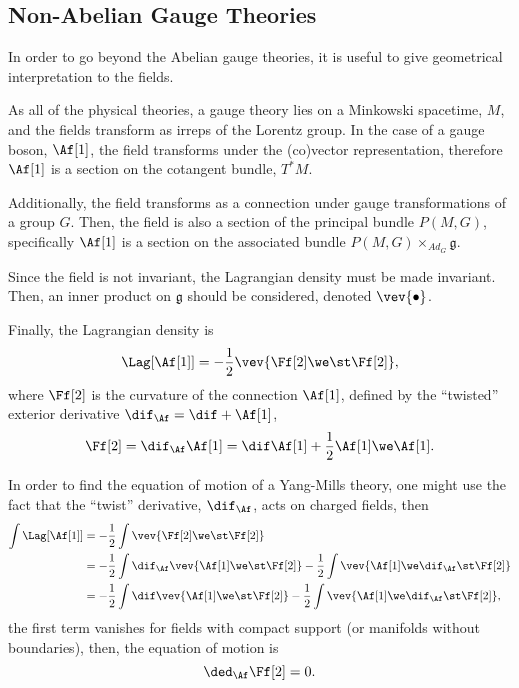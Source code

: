 \subsection{Non-Abelian Gauge Theories}

In order to go beyond the Abelian gauge theories, it is useful to give geometrical interpretation to the fields.

As all of the physical theories, a gauge theory lies on a Minkowski spacetime, $M$, and the fields transform as irreps of the Lorentz group. In the case of a gauge boson,  $\Af[1]$, the field transforms under the (co)vector representation, therefore $\Af[1]$ is a section on the cotangent bundle, $T^*M$.

Additionally, the field transforms as a connection under gauge transformations of a group $G$. Then, the field is also a section of the principal bundle $P(M,G)$, specifically $\Af[1]$ is a section on the associated bundle $P(M,G) \times_{Ad_G} \mathfrak{g}$.

Since the field is not invariant, the Lagrangian density must be made invariant. Then, an inner product on $\mathfrak{g}$ should be considered, denoted $\vev{\bullet}$.

Finally, the Lagrangian density is
\begin{equation}
  \Lag[\Af[1]] = -\frac{1}{2} \vev{ \Ff[2] \we \st \Ff[2] },
\end{equation}
where $\Ff[2]$ is the curvature of the connection $\Af[1]$, defined by the ``twisted'' exterior derivative $\dif_{\Af}= \dif + \Af[1]$,
\begin{equation}
  \Ff[2] = \dif_{\Af} \Af[1] = \dif\Af[1] + \frac{1}{2} \Af[1] \we \Af[1].
\end{equation}


\begin{WEbox}[%
    frametitle={Equations of Motion for Yang-Mills Theories},
    frametitlerule=true,
    frametitlealignment=\centering,
    frametitleaboveskip=10pt,]
  In order to find the equation of motion of a Yang-Mills theory, one might use the fact that the ``twist'' derivative, $\dif_{\Af}$, acts on charged fields, then
  \begin{align*}
    \int \Lag[\Af[1]]
    &= -\frac{1}{2} \int \vev{ \Ff[2]\we \st \Ff[2] } \\
    &= -\frac{1}{2} \int \dif_{\Af} \vev{ \Af[1] \we \st \Ff[2] } - \frac{1}{2}\int \vev{ \Af[1] \we \dif_{\Af} \st \Ff[2] } \\
    &= -\frac{1}{2} \int \dif \vev{ \Af[1] \we \st \Ff[2] } - \frac{1}{2} \int \vev{ \Af[1] \we \dif_{\Af} \st \Ff[2] },
  \end{align*}
  the first term vanishes for fields with compact support (or manifolds without boundaries), then, the equation of motion is 
  \begin{equation*}
    \ded_{\Af} \Ff[2] = 0.
  \end{equation*}
\end{WEbox}





